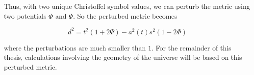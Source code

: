 Thus, with two unique Christoffel symbol values, we can perturb the metric using two potentials $\Phi$ and $\Psi$. So the perturbed metric becomes 

\begin{equation}
	d^2 = t^2(1+2\Psi) - a^2(t)s^2(1-2\Phi)
\end{equation}

where the perturbations are much smaller than $1$. For the remainder of this thesis, calculations involving the geometry of the universe will be based on this perturbed metric.
















